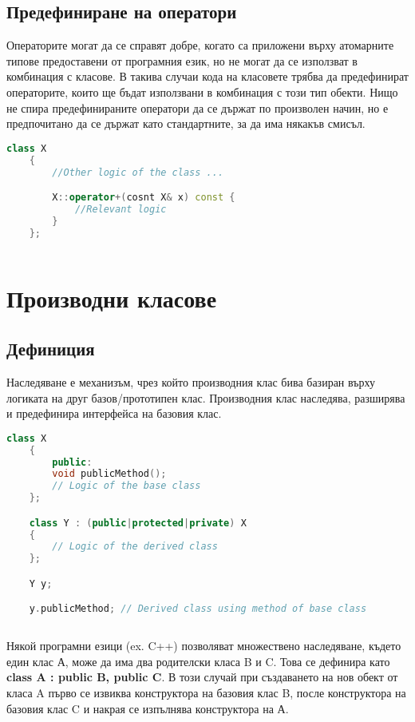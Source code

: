 \documentclass[fleqn,12pt]{article}
\begin{document}
\subsection{Предефиниране на оператори}
Операторите могат да се справят добре, когато са приложени върху атомарните типове предоставени от програмния език, но не могат да се използват в комбинация с класове. В такива случаи кода на класовете трябва да предефинират операторите, които ще бъдат използвани в комбинация с този тип обекти. Нищо не спира предефинираните оператори да се държат по произволен начин, но е предпочитано да се държат като стандартните, за да има някакъв смисъл.

\begin{lstlisting}[language=C++, caption=Example overriding of an operator]
    class X
    {
        //Other logic of the class ...

        X::operator+(cosnt X& x) const {
            //Relevant logic
        }
    };
    
\end{lstlisting}


\section{Производни класове}
\subsection{Дефиниция}
Наследяване е механизъм, чрез който производния клас бива базиран върху логиката на друг базов/прототипен клас. Производния клас наследява, разширява и предефинира интерфейса на базовия клас. 

\begin{lstlisting}[language=C++, caption=Example inheritence]
    class X
    {
        public:
        void publicMethod();
        // Logic of the base class
    };

    class Y : (public|protected|private) X
    {
        // Logic of the derived class
    };

    Y y;

    y.publicMethod; // Derived class using method of base class
    
\end{lstlisting}

Някой програмни езици (ex. C++) позволяват множествено наследяване, където един клас А, може да има два родителски класа B и C. Това се дефинира като \textbf{ class A : public B, public C}. В този случай при създаването на нов обект от класа A първо се извиква конструктора на базовия клас B, после конструктора на базовия клас C и накрая се изпълнява конструктора на А.
\end{document}
